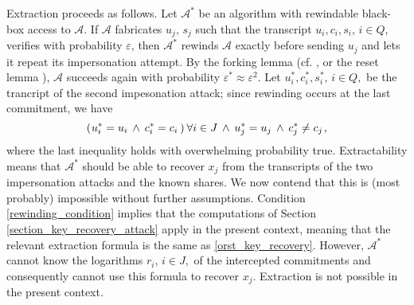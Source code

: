 \documentclass{iacrtrans}
\begin{document}
Extraction proceeds as follows.
Let $\mathcal{A}^*$ be an algorithm with rewindable
black-box access to $\mathcal{A}$.
If $\mathcal{A}$ fabricates
$u_j,\hspace{2pt} s_j$ such that
the transcript $u_i, c_i, s_i,\hspace{2pt} i \in Q,$
verifies with probability $\varepsilon$,
then $\mathcal{A}^*$ rewinds $\mathcal{A}$
exactly before sending $u_j$ and
lets it repeat its impersonation attempt.
By the forking lemma
(cf. \cite{paper_bellare_musig},
or the reset lemma \cite{paper_bellare_palacio}),
$\mathcal{A}$ succeeds again with probability
$\varepsilon^* \approx \varepsilon ^ 2$.
Let $u_i^*, c_i^*, s_i^*,\hspace{2pt}i \in Q,$ be the
trancript of the second impesonation attack;
since rewinding occurs at the last commitment, we have
\vspace{3pt}
\begin{equation}\label{rewinding_condition}
(
	\hspace{0.5pt}
	u_i^* = u_i
	\hspace{2pt}
	\land
	\hspace{2pt}
	c_i^* = c_i
	\hspace{2pt}
)\hspace{2pt}\forall i \in J
\hspace{2pt}
\land
\hspace{2pt}
u_j^* = u_j
\hspace{2pt}
\land
\hspace{2pt}
c_j^* \neq c_j\hspace{1pt},
\vspace{3pt}
\end{equation}
where the last inequality holds with overwhelming probability true.
Extractability means that
$\mathcal{A}^*$ should be able to recover $x_j$
from the transcripts of the two
impersonation attacks and the known shares.
We now contend that this is (most probably) impossible
without further assumptions.
Condition \eqref{rewinding_condition} implies that the
computations of Section \ref{section_key_recovery_attack}
apply in the present context,
meaning that the relevant extraction
formula is the same as \eqref{orst_key_recovery}.
However, $\mathcal{A}^*$
cannot know the logarithms $r_i,\hspace{2pt} i \in J,$
of the intercepted commitments
and consequently cannot use
this formula to recover $x_j$.
Extraction is not possible in the present context.
\end{document}

